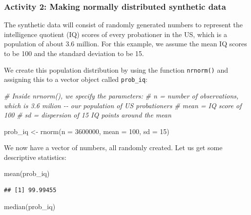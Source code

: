 \documentclass[
]{book}
\newenvironment{Shaded}{\begin{snugshade}}{\end{snugshade}}
\newcommand{\AttributeTok}[1]{\textcolor[rgb]{0.77,0.63,0.00}{#1}}
\newcommand{\CommentTok}[1]{\textcolor[rgb]{0.56,0.35,0.01}{\textit{#1}}}
\newcommand{\DecValTok}[1]{\textcolor[rgb]{0.00,0.00,0.81}{#1}}
\newcommand{\FunctionTok}[1]{\textcolor[rgb]{0.00,0.00,0.00}{#1}}
\newcommand{\NormalTok}[1]{#1}
\newcommand{\OtherTok}[1]{\textcolor[rgb]{0.56,0.35,0.01}{#1}}
\begin{document}
\hypertarget{activity-2-making-normally-distributed-synthetic-data}{%
\subsubsection{Activity 2: Making normally distributed synthetic data}\label{activity-2-making-normally-distributed-synthetic-data}}

The synthetic data will consist of randomly generated numbers to represent the intelligence quotient (IQ) scores of every probationer in the US, which is a population of about 3.6 million. For this example, we assume the mean IQ scores to be 100 and the standard deviation to be 15.

We create this population distribution by using the function \texttt{nrnorm()} and assigning this to a vector object called \texttt{prob\_iq}:

\begin{Shaded}
\begin{Highlighting}[]
\CommentTok{\# Inside nrnorm(), we specify the parameters:}
\CommentTok{\# n = number of observations, which is 3.6 milion {-}{-} our population of US probationers}
\CommentTok{\# mean = IQ score of 100}
\CommentTok{\# sd = dispersion of 15 IQ points around the mean}

\NormalTok{prob\_iq }\OtherTok{\textless{}{-}} \FunctionTok{rnorm}\NormalTok{(}\AttributeTok{n =} \DecValTok{3600000}\NormalTok{, }\AttributeTok{mean =} \DecValTok{100}\NormalTok{, }\AttributeTok{sd =} \DecValTok{15}\NormalTok{)}
\end{Highlighting}
\end{Shaded}

We now have a vector of numbers, all randomly created. Let us get some descriptive statistics:

\begin{Shaded}
\begin{Highlighting}[]
\FunctionTok{mean}\NormalTok{(prob\_iq) }
\end{Highlighting}
\end{Shaded}

\begin{verbatim}
## [1] 99.99455
\end{verbatim}

\begin{Shaded}
\begin{Highlighting}[]
\FunctionTok{median}\NormalTok{(prob\_iq) }
\end{Highlighting}
\end{Shaded}
\end{document}

